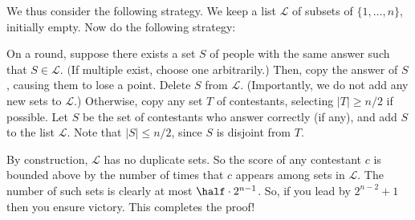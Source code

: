 \documentclass[11pt]{scrartcl}
\begin{document}
We thus consider the following strategy.
We keep a list $\mathcal L$ of subsets of $\{1, \dots, n\}$, initially empty.
Now do the following strategy:
\begin{itemize}
  \ii On a round, suppose there exists a set $S$ of people
  with the same answer such that $S \in \mathcal L$.
  $($If multiple exist, choose one arbitrarily.)
  Then, copy the answer of $S$, causing them to lose a point.
  Delete $S$ from $\mathcal L$.
  (Importantly, we do not add any new sets to $\mathcal L$.)
  \ii Otherwise, copy any set $T$ of contestants,
  selecting $|T| \ge n/2$ if possible.
  Let $S$ be the set of contestants who answer correctly (if any),
  and add $S$ to the list $\mathcal L$.
  Note that $|S| \le n/2$, since $S$ is disjoint from $T$.
\end{itemize}
By construction, $\mathcal L$ has no duplicate sets.
So the score of any contestant $c$ is bounded above by the number of times
that $c$ appears among sets in $\mathcal L$.
The number of such sets is clearly at most $\half \cdot 2^{n-1}$.
So, if you lead by $2^{n-2}+1$ then you ensure victory.
This completes the proof!
\end{document}
